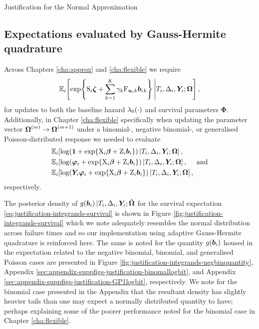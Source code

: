 \begin{chapter}{\label{cha:justification}Justification for the Normal Approximation}
  \subsection{Expectations evaluated by Gauss-Hermite quadrature}\label{sec:justification-integrands-normals}
  Across Chapters \ref{cha:approx} and \ref{cha:flexible} we require
  \begin{align}
      \operatorname{\mathbb{E}}_i\!\left[\exp\!\left\{\mathrm{S}_i\bm{\zeta}+\sum_{k=1}^K\gamma_k\mathrm{F}_{\bm{u}_ik}\bm{b}_i{_k}\right\}\Bigg|T_i,\Delta_i,\bm{Y}_i;\bm{\mathrm{\Omega}}\right],
  \label{eq:justification-integrands-survival}
  \end{align}
  for updates to both the baseline hazard $\lambda_0\!\left(\cdot\right)$ and survival parameters $\bm{\Phi}$. Additionally, in Chapter \ref{cha:flexible} specifically when updating the parameter vector $\bm{\mathrm{\Omega}}^{(m)}\rightarrow\bm{\mathrm{\Omega}}^{(m+1)}$ under a binomial-, negative binomial-, or generalised Poisson-distributed response we needed to evaluate
  \begin{equation}
    \begin{aligned}
        \Exp_i&\ls\log\lb\bone+\exp\lbr\X_i\bb+\Z_i\b\rbr\rb|T_i,\Delta_i,\Y;\bO\rs,\\
        \Exp_i&\ls\log\lb\bphi+\exp\lbr\X_i\bb+\Z_i\b\rbr\rb|T_i,\Delta_i,\Y;\bO\rs,\quad\ \mathrm{and}\\
        \Exp_i&\ls\log\lb\Y\bphi+\exp\lbr\X_i\bb+\Z_i\b\rbr\rb|T_i,\Delta_i,\Y;\bO\rs,
    \end{aligned}
  \label{eq:justification-integrands-logexps}    
  \end{equation}
  respectively. 

  The posterior density of $g\!\left(\bm{b}_i\right)|T_i,\Delta_i,\bm{Y}_i;\hat{\bm{\Omega}}$ for the survival expectation \eqref{eq:justification-integrands-survival} is shown in Figure \ref{fig:justification-integrands-survival} which we note adequately resembles the normal distribution across failure times and so our implementation using adaptive Gauss-Hermite quadrature is reinforced here. The same is noted for the quantity $g\!\left(\bm{b}_i\right)$ housed in the expectation related to the negative binomial, binomial, and generalised Poisson cases are presented in Figure \ref{fig:justification-integrands-negbinquantity}, Appendix \ref{sec:appendix-suppfigs-justification-binomallogbit}, and Appendix \ref{sec:appendix-suppfigs-justification-GP1logbit}, respectively. We note for the binomial case presented in the Appendix that the resultant density has slightly heavier tails than one may expect a normally distributed quantity to have; perhaps explaining some of the poorer performance noted for the binomial case in Chapter \ref{cha:flexible}.


\end{chapter}
